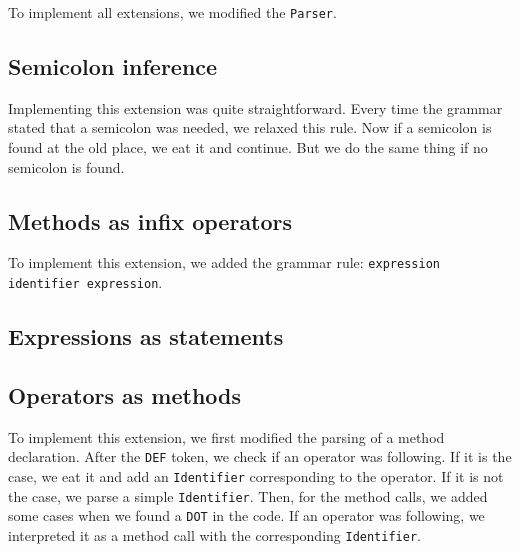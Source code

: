 To implement all extensions, we modified the \lstinline$Parser$.

\subsection{Semicolon inference}
Implementing this extension was quite straightforward. Every time the grammar stated that a semicolon was needed, we relaxed this rule. Now if a semicolon is found at the old place, we eat it and continue. But we do the same thing if no semicolon is found.

\subsection{Methods as infix operators}
To implement this extension, we added the grammar rule: \lstinline$expression identifier expression$.

\subsection{Expressions as statements}

\subsection{Operators as methods}
To implement this extension, we first modified the parsing of a method declaration. After the \lstinline$DEF$ token, we check if an operator was following. If it is the case, we eat it and add an \lstinline$Identifier$ corresponding to the operator. If it is not the case, we parse a simple \lstinline$Identifier$. Then, for the method calls, we added some cases when we found a \lstinline$DOT$ in the code. If an operator was following, we interpreted it as a method call with the corresponding \lstinline$Identifier$.
